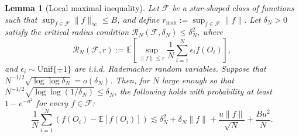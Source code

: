 \documentclass[11pt]{article}
\theoremstyle{plain}
\newtheorem{lemma}{Lemma}
\theoremstyle{definition}
\theoremstyle{remark}
\theoremstyle{definition}
\begin{document}
 



\begin{lemma}[Local maximal inequality]\label{lemma:loc_max_ineq}
Let \( \mathcal{F} \) be a star-shaped class of functions such that \( \sup_{f \in \mathcal{F}} \|f\|_{\infty} \le B \), and define \( r_{\max} := \sup_{f \in \mathcal{F}} \|f\| \). Let \( \delta_N > 0 \) satisfy the critical radius condition \( \mathcal{R}_N(\mathcal{F}, \delta_N) \le \delta_N^2 \), where
\[
\mathcal{R}_N(\mathcal{F}, r) := \mathbb{E}\left[\sup_{\|f\| \le r} \frac{1}{N} \sum_{i=1}^N \epsilon_i f(O_i)\right],
\]
and \( \epsilon_i \sim \mathrm{Unif}\{\pm 1\} \) are i.i.d. Rademacher random variables. Suppose that $ N^{-1/2} \sqrt{\log \log \delta_N} =  o(\delta_N)$. Then, for \(N\) large enough so that \( N^{-1/2} \sqrt{\log \log (1/\delta_N)} \le \delta_N \), the following holds with probability at least \(1 - e^{-u^2}\) for every \( f \in \mathcal{F} \): 
\[
\frac{1}{N} \sum_{i=1}^N \left(f(O_i) - \mathbb{E}[f(O_i)]\right)
\lesssim \delta_N^2 +  \delta_N \|f\| + \frac{u \|f\|}{\sqrt{N}} + \frac{B u^2}{N}.
\]
\end{lemma}
\end{document}
